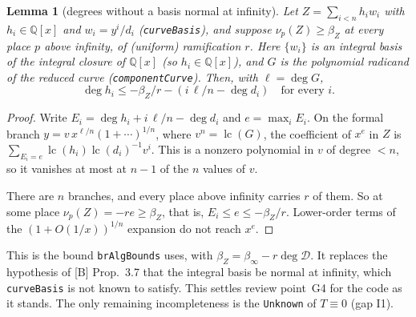 \documentclass[11pt]{article}
\newtheorem{lemma}[theorem]{Lemma}
\theoremstyle{definition}
\theoremstyle{remark}
\newcommand{\Q}{\mathbb{Q}}
\newcommand{\lc}{\operatorname{lc}}
\newcommand{\code}[1]{\texttt{#1}}
\begin{document}
\begin{lemma}[degrees without a basis normal at infinity]\label{lem:E1inf}
Let $Z=\sum_{i<n}h_iw_i$ with $h_i\in\Q[x]$ and $w_i=y^i/d_i$ (\code{curveBasis}), and suppose
$\nu_p(Z)\ge\beta_Z$ at every place $p$ above infinity, of (uniform) ramification $r$. Here
$\{w_i\}$ is an integral basis of the integral closure of $\Q[x]$ (so $h_i\in\Q[x]$), and $G$
is the polynomial radicand of the reduced curve (\code{componentCurve}). Then, with
$\ell=\deg G$,
\[ \deg h_i\le -\beta_Z/r-(i\,\ell/n-\deg d_i)\quad\text{for every }i. \]
\end{lemma}
\begin{proof}
Write $E_i=\deg h_i+i\,\ell/n-\deg d_i$ and $e=\max_iE_i$. On the formal branch
$y=v\,x^{\ell/n}(1+\cdots)^{1/n}$, where $v^n=\lc(G)$, the coefficient of $x^e$ in $Z$ is
$\sum_{E_i=e}\lc(h_i)\lc(d_i)^{-1}v^i$. This is a nonzero polynomial in $v$ of degree $<n$, so
it vanishes at most at $n-1$ of the $n$ values of $v$.

There are $n$ branches, and every place above infinity carries $r$ of them. So at some place
$\nu_p(Z)=-re\ge\beta_Z$, that is, $E_i\le e\le -\beta_Z/r$. Lower-order terms of the
$(1+O(1/x))^{1/n}$ expansion do not reach $x^e$.
\end{proof}

\noindent This is the bound \code{brAlgBounds} uses, with $\beta_Z=\beta_\infty-r\deg\mathcal D$. It replaces
the hypothesis of [B] Prop.~3.7 that the integral basis be normal at infinity, which
\code{curveBasis} is not known to satisfy. This settles review point~G4 for the code as it
stands. The only remaining incompleteness is the \code{Unknown} of $T\equiv0$ (gap I1).
\end{document}
